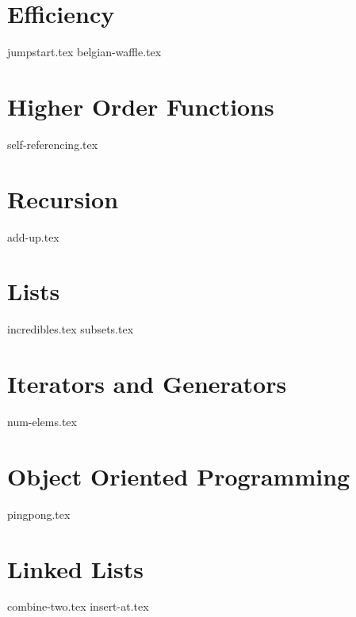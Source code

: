 \documentclass{exam}
\begin{document}
\section{Efficiency}
\begin{questions}
    {jumpstart.tex}
    {belgian-waffle.tex}
\end{questions}

\section{Higher Order Functions}
\begin{questions}
    {self-referencing.tex}
\end{questions}

\section{Recursion}
\begin{questions}
    {add-up.tex}
\end{questions}

\section{Lists}
\begin{questions}
    {incredibles.tex}
    {subsets.tex}
\end{questions}

\section{Iterators and Generators}
\begin{questions}
    {num-elems.tex}
\end{questions}

\section{Object Oriented Programming}
\begin{questions}
    {pingpong.tex}
\end{questions}

\section{Linked Lists}
\begin{questions}
    {combine-two.tex}
    {insert-at.tex}
\end{questions}
\end{document}
